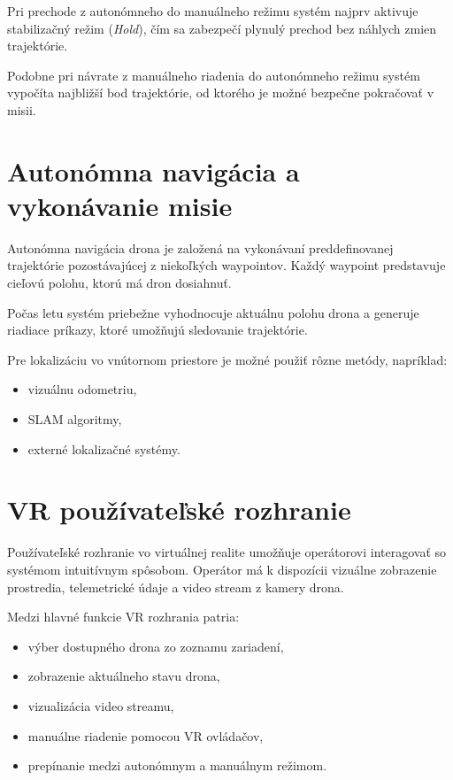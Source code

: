 \documentclass[a4paper,12pt]{article}
\begin{document}
Pri prechode z autonómneho do manuálneho režimu systém najprv aktivuje stabilizačný režim 
(\textit{Hold}), čím sa zabezpečí plynulý prechod bez náhlych zmien trajektórie.

Podobne pri návrate z manuálneho riadenia do autonómneho režimu systém vypočíta najbližší bod 
trajektórie, od ktorého je možné bezpečne pokračovať v misii.

\section{Autonómna navigácia a vykonávanie misie}

Autonómna navigácia drona je založená na vykonávaní preddefinovanej trajektórie pozostávajúcej z 
niekoľkých waypointov. Každý waypoint predstavuje cieľovú polohu, ktorú má dron dosiahnuť.

Počas letu systém priebežne vyhodnocuje aktuálnu polohu drona a generuje riadiace príkazy, 
ktoré umožňujú sledovanie trajektórie.

Pre lokalizáciu vo vnútornom priestore je možné použiť rôzne metódy, napríklad:

\begin{itemize}
\item vizuálnu odometriu,
\item SLAM algoritmy,
\item externé lokalizačné systémy.
\end{itemize}

\section{VR používateľské rozhranie}

Používateľské rozhranie vo virtuálnej realite umožňuje operátorovi interagovať so systémom 
intuitívnym spôsobom. Operátor má k dispozícii vizuálne zobrazenie prostredia, telemetrické údaje 
a video stream z kamery drona.

Medzi hlavné funkcie VR rozhrania patria:

\begin{itemize}
\item výber dostupného drona zo zoznamu zariadení,
\item zobrazenie aktuálneho stavu drona,
\item vizualizácia video streamu,
\item manuálne riadenie pomocou VR ovládačov,
\item prepínanie medzi autonómnym a manuálnym režimom.
\end{itemize}
\end{document}
